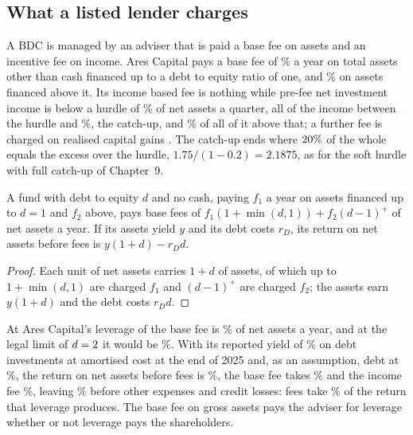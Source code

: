 \begin{chapterrefs}
\subsection{What a listed lender charges}

A BDC is managed by an adviser that is paid a base fee on assets and an incentive fee on income. Ares
Capital pays a base fee of \dlBaseLo\% a year on total assets other than cash financed up to a debt to
equity ratio of one, and \dlBaseHi\% on assets financed above it. Its income based fee is nothing while
pre-fee net investment income is below a hurdle of \dlHurdleQ\% of net assets a quarter, all of the
income between the hurdle and \dlCatchQ\%, the catch-up, and \dlIncRate\% of all of it above that; a
further fee is charged on realised capital gains \parencite{arcc2025}. The catch-up ends where
$20\%$ of the whole equals the excess over the hurdle, $1.75/(1-0.2)=2.1875$, as for the soft
hurdle with full catch-up of Chapter~9.

\begin{proposition}\label{prop6:bdcfee}
A fund with debt to equity $d$ and no cash, paying $f_1$ a year on assets financed up to $d=1$ and $f_2$
above, pays base fees of $f_1(1+\min(d,1))+f_2(d-1)^+$ of net assets a year. If its assets yield $y$ and
its debt costs $r_D$, its return on net assets before fees is $y(1+d)-r_Dd$.
\end{proposition}

\begin{proof}
Each unit of net assets carries $1+d$ of assets, of which up to $1+\min(d,1)$ are charged $f_1$ and
$(d-1)^+$ are charged $f_2$; the assets earn $y(1+d)$ and the debt costs $r_Dd$.
\end{proof}

 At Ares Capital's leverage of \dlDeArcc{} the base fee is \dlBaseNaArcc\% of net assets a year,
and at the legal limit of $d=2$ it would be \dlBaseNaMax\%. With its reported yield of
\dlYieldArcc\% on debt investments at amortised cost at the end of 2025 \parencite{arcc2025} and, as an
assumption, debt at \dlExRd\%, the return on net assets before fees is \dlExGross\%, the base fee takes
\dlExBase\% and the income fee \dlExInc\%, leaving \dlExNet\% before other expenses and credit losses:
fees take \dlExFeeShare\% of the return that leverage produces. The base fee on gross assets pays the
adviser for leverage whether or not leverage pays the shareholders.


\end{chapterrefs}
